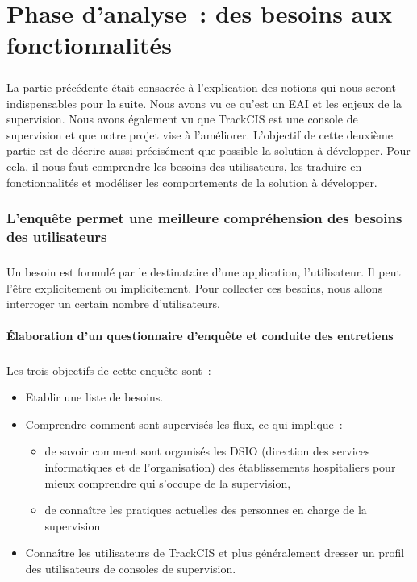 \chapter{Phase d'analyse~: des besoins aux fonctionnalités}
	\paragraph{}
	La partie précédente était consacrée à l'explication des notions qui nous
	seront indispensables pour la suite. Nous avons vu
	ce qu'est un EAI et les enjeux de la supervision. Nous avons également vu que
	TrackCIS est une console de supervision et que notre projet vise à l'améliorer.
	L'objectif de cette deuxième partie est de décrire aussi précisément que
	possible la solution à développer. Pour cela, il nous faut comprendre les
	besoins des utilisateurs, les traduire en
	fonctionnalités et modéliser les comportements de la solution à développer.
	
	\subsection{L'enquête permet une meilleure compréhension des besoins des utilisateurs}
		\paragraph{}
		Un besoin est formulé par le destinataire d'une application, l'utilisateur. Il
		peut l'être explicitement ou implicitement. Pour collecter ces besoins, nous
		allons interroger un certain nombre d'utilisateurs.
		
		\subsubsection{Élaboration d'un questionnaire d'enquête et conduite des entretiens}
			\paragraph{}%
			Les trois objectifs de cette enquête sont~:
			\begin{itemize}
			  \item Etablir une liste de besoins.
			  \item Comprendre comment sont supervisés les flux, ce qui implique~:
			  \begin{itemize}
			    \item de savoir comment sont
			  	organisés les DSIO (direction des services informatiques et de
			  	l’organisation) des établissements hospitaliers pour mieux comprendre qui
			  	s'occupe de la supervision,
			  	\item de connaître les pratiques actuelles des personnes en charge de la
			  	supervision
			  	\end{itemize}
			  \item Connaître les utilisateurs de TrackCIS et plus généralement dresser
			  un profil des utilisateurs de consoles de supervision.
			\end{itemize}
			
